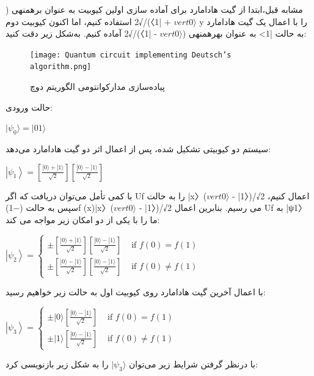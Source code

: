 \documentclass{book}
\begin{document}
مشابه قبل،‌ابتدا از گیت هادامارد برای آماده سازی اولین کیوبیت به عنوان برهمنهی ($vert 0 \rangle$ + |1〉)/√2 استفاده کنیم، اما اکنون کیوبیت دوم y را با اعمال یک گیت هادامارد به حالت |1> به عنوان بهرهمنهی ($vert 0 \rangle$ - |1〉)/√2 آماده کنیم. به‌شکل زیر دقت کنید:



\begin{figure}[ht]
	\centering
	\texttt{[image: Quantum circuit implementing Deutsch’s algorithm.png]}
	\caption{پیاده‌سازی مدارکوانتومی‌ الگوریتم دوچ}
\end{figure}

\newpage

حالت ورودی:\\
\begin{center}
	$\vert\psi_{0}\rangle = \vert01\rangle$
\end{center}

سیستم دو کیوبیتی تشکیل شده،‌ پس از اعمال اثر دو گیت هادامارد می‌دهد:\\

\begin{center}
$\left|\psi_1\right\rangle=\left[\frac{|0\rangle+|1\rangle}{\sqrt{2}}\right]\left[\frac{|0\rangle-|1\rangle}{\sqrt{2}}\right]$
\end{center}
با کمی تأمل می‌توان دریافت که اگر Uf را به حالت |x〉($vert 0 \rangle$ - |1〉)/√2 اعمال کنیم، سپس به حالت (−1)f (x)|x〉($vert 0 \rangle$ - |1〉)/√2 می رسیم. بنابرین اعمال Uf به |ψ1〉 ما را با یکی از دو امکان زیر مواجه می کند:
\begin{center}
	$\left|\psi_2\right\rangle= \begin{cases} \pm\left[\frac{|0\rangle+|1\rangle}{\sqrt{2}}\right]\left[\frac{|0\rangle-|1\rangle}{\sqrt{2}}\right] & \text { if } f(0)=f(1) \\ \pm\left[\frac{|0\rangle-|1\rangle}{\sqrt{2}}\right]\left[\frac{|0\rangle-|1\rangle}{\sqrt{2}}\right] & \text { if } f(0) \neq f(1) \end{cases}$
\end{center}
با اعمال آخرین گیت هادامارد روی کیوبیت اول به حالت زیر خواهیم رسید:
\begin{center}
	$\left|\psi_3\right\rangle= \begin{cases} \pm|0\rangle\left[\frac{|0\rangle-|1\rangle}{\sqrt{2}}\right] & \text { if } f(0)=f(1) \\ \pm|1\rangle\left[\frac{|0\rangle-|1\rangle}{\sqrt{2}}\right] & \text { if } f(0) \neq f(1) \end{cases}$
\end{center}
با درنظر گرفتن شرایط زیر می‌توان $\vert\psi_{3}\rangle$ را به شکل زیر بازنویسی کرد:
\end{document}
